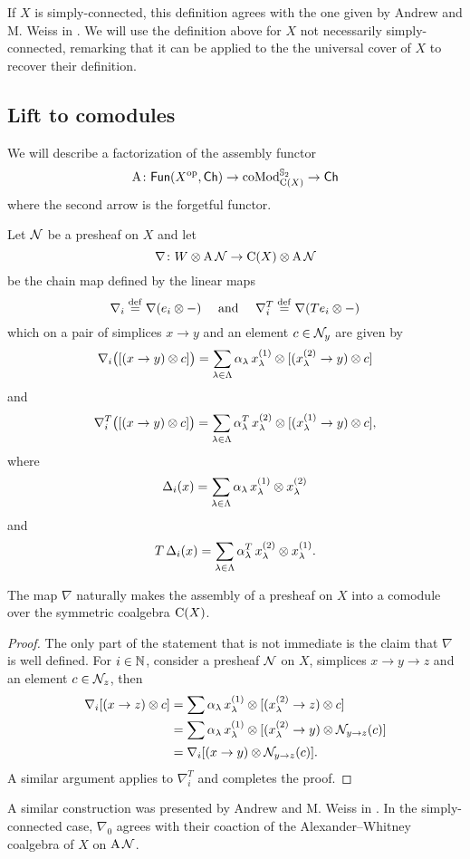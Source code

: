 If $X$ is simply-connected, this definition agrees with the one given by Andrew and M. Weiss in \cite[Definition 1.4]{ranicki1990assembly}.
We will use the definition above for $X$ not necessarily simply-connected, remarking that it can be applied to the the universal cover of $X$ to recover their definition.

\subsection{Lift to comodules}

We will describe a factorization of the assembly functor
\[
\operatorname{A} \colon \mathsf{Fun}(X^{\mathrm{op}}, \mathsf{Ch}) \to \operatorname{coMod}^{\mathbb{S}_2}_{\operatorname{C}(X)} \to \mathsf{Ch}
\]
where the second arrow is the forgetful functor.

Let $\mathcal{N}$ be a presheaf on $X$ and let
\[
\nabla \colon W \otimes \operatorname{A} \mathcal{N} \to \operatorname{C}(X) \otimes \operatorname{A} \mathcal{N}
\]
be the chain map defined by the linear maps
\[
\nabla_i \stackrel{\mathrm{def}}{=} \nabla(e_i \otimes -)
\quad \text{ and } \quad
\nabla_i^T \stackrel{\mathrm{def}}{=} \nabla(Te_i \otimes -)
\]
which on a pair of simplices $x \to y$ and an element $c \in \mathcal{N}_y$ are given by
\[
\nabla_i \big( [(x \to y) \otimes c] \big) =
\sum_{\lambda \in \Lambda} \alpha_\lambda \, x_\lambda^{(1)} \otimes [(x_\lambda^{(2)} \to y) \otimes c]
\]
and
\[
\nabla_i^T \big( [(x \to y) \otimes c] \big) =
\sum_{\lambda \in \Lambda} \alpha^T_\lambda \, x_\lambda^{(2)} \otimes [(x_\lambda^{(1)} \to y) \otimes c],
\]
where
\[
\operatorname{\Delta}_i(x) = \sum_{\lambda \in \Lambda} \alpha_\lambda \, x_\lambda^{(1)} \otimes x_\lambda^{(2)}
\]
and
\[
T \operatorname{\Delta}_i(x) =
\sum_{\lambda \in \Lambda} \alpha^T_\lambda \, x_\lambda^{(2)} \otimes x_\lambda^{(1)}.
\]

\begin{lemma*}
	The map $\nabla$ naturally makes the assembly of a presheaf on $X$ into a comodule over the symmetric coalgebra $\operatorname{C}(X)$.
\end{lemma*}

\begin{proof}
	The only part of the statement that is not immediate is the claim that $\nabla$ is well defined.
	For $i \in \mathbb{N}$, consider a presheaf $\mathcal{N}$ on $X$, simplices $x \to y \to z$ and an element $c \in \mathcal{N}_z$, then
	\begin{align*}
		\nabla_i [(x \to z) \otimes c] &=
		\sum \alpha_\lambda \, x^{(1)}_\lambda \otimes {[(x^{(2)}_\lambda \to z) \otimes c]} \\ &=
		\sum \alpha_\lambda \, x^{(1)}_\lambda \otimes [(x^{(2)}_\lambda \to y) \otimes \mathcal{N}_{y \to z}(c)] \\ &=
		\nabla_i [(x \to y) \otimes \mathcal{N}_{y \to z}(c)].
	\end{align*}
	A similar argument applies to $\nabla^T_i$ and completes the proof.
\end{proof}

A similar construction was presented by Andrew and M. Weiss in \cite[Proposition~5.3]{ranicki1990assembly}.
In the simply-connected case, $\nabla_0$ agrees with their coaction of the Alexander--Whitney coalgebra of $X$ on $\operatorname{A} \mathcal{N}$.